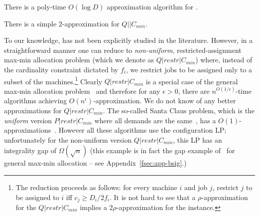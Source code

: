 \begin{theorem}\label{fthm:cckp}
	There is a poly-time $O(\log D)$ approximation algorithm for \cckp.
\end{theorem}

\begin{theorem} \label{fthm:cckp-soft}
 There is a simple $2$-approximation for $Q || C_{min}$.
 \end{theorem}

	To our knowledge, \cckp has not been explicitly studied in the literature. %
	However, in a straightforward manner one can reduce \cckp to {\em non-uniform}, restricted-assignment max-min allocation problem (which we denote as $Q|restr|C_{min}$) where,  instead of the cardinality constraint dictated by $f_i$, we restrict jobs to be assigned only to a subset of the machines.\footnote{
	The reduction proceeds as follows: for every machine $i$ and job $j$, restrict $j$ to be assigned to $i$ iff $c_j \geq D_i/2f_i$. It is not hard to see that a $\rho$-approximation for the $Q|restr|C_{min}$ implies a $2\rho$-approximation for the \cckp instance.} Clearly $Q|restr|C_{min}$  is a special case of the general max-min allocation problem~\cite{ChakrabartyCK09} and therefore for any $\epsilon>0$, there are $n^{O(1/\epsilon)}$-time algorithms
achieving $O(n^\epsilon)$-approximation. We do not know of any better approximations for $Q|restr|C_{min}$. The so-called Santa Claus problem, which is the {\em uniform} version $P|restr|C_{min}$ where all demands are the same~\cite{BansalS06}, has a $O(1)$-approximations~\cite{Feige08,AsadpourFS12,PolacekS16}. However all these algorithms use the configuration LP; unfortunately for the non-uniform version $Q|restr|C_{min}$, this LP has an integrality gap of $\Omega(\sqrt{n})$ (this example is in fact the gap example of~\cite{BansalS06} for general max-min allocation -- see Appendix~\ref{fsec:app-bsig}.)%



